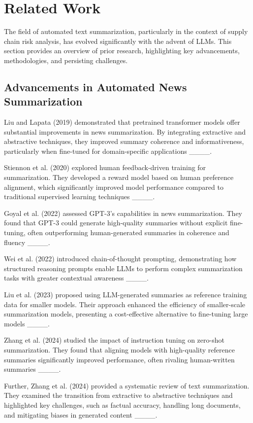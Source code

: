 \section{Related Work}
The field of automated text summarization, particularly in the context of supply chain risk analysis, has evolved significantly with the advent of LLMs. This section provides an overview of prior research, highlighting key advancements, methodologies, and persisting challenges.

\subsection{Advancements in Automated News Summarization}

Liu and Lapata (2019) demonstrated that pretrained transformer models offer substantial improvements in news summarization. By integrating extractive and abstractive techniques, they improved summary coherence and informativeness, particularly when fine-tuned for domain-specific applications ____.

Stiennon et al. (2020) explored human feedback-driven training for summarization. They developed a reward model based on human preference alignment, which significantly improved model performance compared to traditional supervised learning techniques ____.

Goyal et al. (2022) assessed GPT-3's capabilities in news summarization. They found that GPT-3 could generate high-quality summaries without explicit fine-tuning, often outperforming human-generated summaries in coherence and fluency ____.

Wei et al. (2022) introduced chain-of-thought prompting, demonstrating how structured reasoning prompts enable LLMs to perform complex summarization tasks with greater contextual awareness ____.

Liu et al. (2023) proposed using LLM-generated summaries as reference training data for smaller models. Their approach enhanced the efficiency of smaller-scale summarization models, presenting a cost-effective alternative to fine-tuning large models ____.

Zhang et al. (2024) studied the impact of instruction tuning on zero-shot summarization. They found that aligning models with high-quality reference summaries significantly improved performance, often rivaling human-written summaries ____.

Further, Zhang et al. (2024) provided a systematic review of text summarization. They examined the transition from extractive to abstractive techniques and highlighted key challenges, such as factual accuracy, handling long documents, and mitigating biases in generated content ____.

